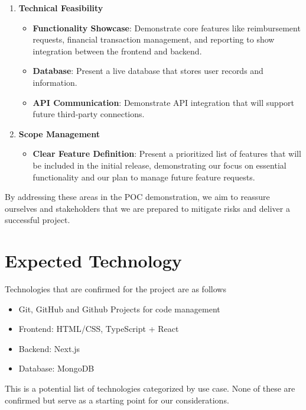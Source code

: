 \documentclass{article}
\begin{document}
\begin{enumerate}[label=\arabic*.]
    \item \textbf{Technical Feasibility}
    \begin{itemize}
        \item \textbf{Functionality Showcase}: Demonstrate core features like reimbursement requests, financial transaction management, and reporting to show integration between the frontend and backend.
        \item \textbf{Database}: Present a live database that stores user records and information.
        \item \textbf{API Communication}: Demonstrate API integration that will support future third-party connections.
    \end{itemize}

    \item \textbf{Scope Management}
    \begin{itemize}
        \item \textbf{Clear Feature Definition}: Present a prioritized list of features that will be included in the initial release, demonstrating our focus on essential functionality and our plan to manage future feature requests.
    \end{itemize}
\end{enumerate}

By addressing these areas in the POC demonstration, we aim to reassure ourselves and stakeholders that we are prepared to mitigate risks and deliver a successful project.


\section{Expected Technology}

Technologies that are confirmed for the project are as follows

\begin{itemize}
  \item Git, GitHub and Github Projects for code management
  \item Frontend: HTML/CSS, TypeScript + React
  \item Backend: Next.js
  \item Database: MongoDB
\end{itemize}

This is a potential list of technologies categorized by use case. None of these are confirmed but serve as a starting point for our considerations.
\end{document}

